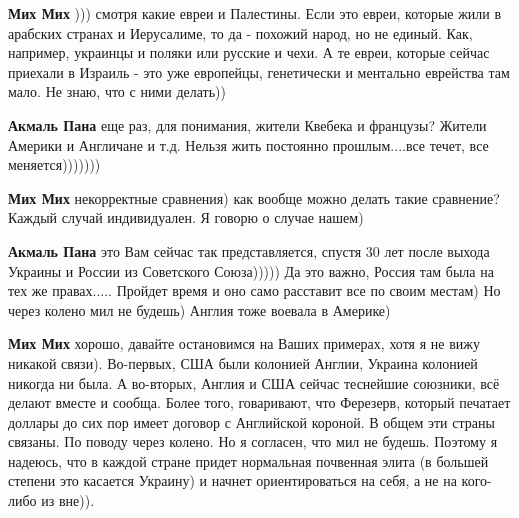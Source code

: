 \begin{itemize}
\begin{itemize}
 
\textbf{Мих Мих} ))) смотря какие евреи и Палестины. Если это евреи, которые жили в арабских странах и Иерусалиме, то да - похожий народ, но не единый. Как, например, украинцы и поляки или русские и чехи. А те евреи, которые сейчас приехали в Израиль - это уже европейцы, генетически и ментально еврейства там мало.
Не знаю, что с ними делать))

 
\textbf{Акмаль Пана} еще раз, для понимания, жители Квебека и французы? Жители Америки и Англичане и т.д. Нельзя жить постоянно прошлым....все течет, все меняется)))))))

 
\textbf{Мих Мих} некорректные сравнения) как вообще можно делать такие сравнение? Каждый случай индивидуален. Я говорю о случае нашем)

 
\textbf{Акмаль Пана} это Вам сейчас так представляется, спустя 30 лет после выхода Украины и России из Советского Союза))))) Да это важно, Россия там была на тех же правах..... Пройдет время и оно само расставит все по своим местам) Но через колено мил не будешь) Англия тоже воевала в Америке)

 
\textbf{Мих Мих} хорошо, давайте остановимся на Ваших примерах, хотя я не вижу никакой связи). Во-первых, США были колонией Англии, Украина колонией никогда ни была. А во-вторых, Англия и США сейчас теснейшие союзники, всё делают вместе и сообща. Более того, говаривают, что Ферезерв, который печатает доллары до сих пор имеет договор с Английской короной. В общем эти страны связаны.
По поводу через колено. Но я согласен, что мил не будешь. Поэтому я надеюсь, что в каждой стране придет нормальная почвенная элита (в большей степени это касается Украину) и начнет ориентироваться на себя, а не на кого-либо из вне)).


\end{itemize}
\end{itemize}
